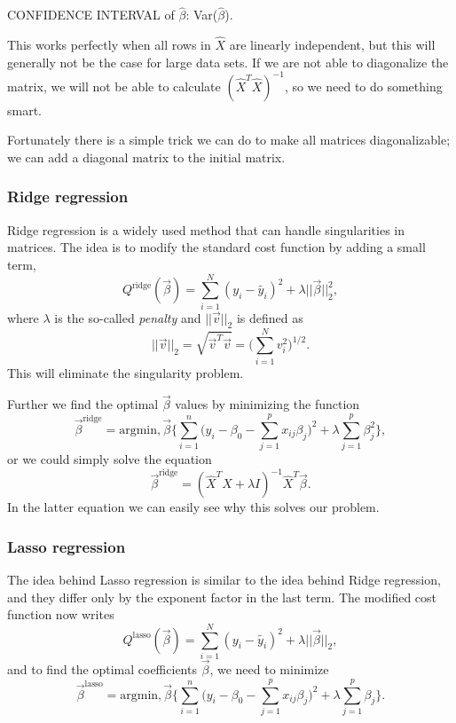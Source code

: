 CONFIDENCE INTERVAL of $\hat{\beta}$: Var($\hat{\beta}$).

This works perfectly when all rows in $\hat{X}$ are linearly independent, but this will generally not be the case for large data sets. If we are not able to diagonalize the matrix, we will not be able to calculate $(\hat{X}^T\hat{X})^{-1}$, so we need to do something smart. 

Fortunately there is a simple trick we can do to make all matrices diagonalizable; we can add a diagonal matrix to the initial matrix. 


\subsubsection{Ridge regression} \label{sec:ridge}
Ridge regression is a widely used method that can handle singularities in matrices. The idea is to modify the standard cost function by adding a small term,
\begin{equation}
Q^{\text{ridge}}(\vec{\beta})=\sum_{i=1}^N(y_i-\tilde{y_i})^2+\lambda||\vec{\beta}||_2^2,
\end{equation}
where $\lambda$ is the so-called \textit{penalty} and $||\vec{v}||_2$ is defined as
\begin{equation}
||\vec{v}||_2=\sqrt{\vec{v}^T\vec{v}}=\Big(\sum_{i=1}^Nv_i^2\Big)^{1/2}.
\end{equation}
This will eliminate the singularity problem.

Further we find the optimal $\vec{\beta}$ values by minimizing the function 
\begin{equation}
\vec{\beta}^{\text{ridge}}=\text{argmin},\vec{\beta}\bigg\{\sum_{i=1}^{n}\Big(y_i-\beta_0-\sum_{j=1}^px_{ij}\beta_j\Big)^2+\lambda\sum_{j=1}^p\beta_j^2\bigg\}, 
\end{equation}
or we could simply solve the equation
\begin{equation}
\vec{\beta}^{\text{ridge}}=(\hat{X}^T\hat{X}+\lambda I)^{-1}\hat{X}^T\vec{\beta}.
\end{equation}
In the latter equation we can easily see why this solves our problem.

\subsubsection{Lasso regression} \label{sec:lasso}
The idea behind Lasso regression is similar to the idea behind Ridge regression, and they differ only by the exponent factor in the last term. The modified cost function now writes
\begin{equation}
Q^{\text{lasso}}(\vec{\beta})=\sum_{i=1}^N(y_i-\tilde{y_i})^2+\lambda||\vec{\beta}||_2,
\end{equation}
and to find the optimal coefficients $\vec{\beta}$, we need to minimize
\begin{equation}
\vec{\beta}^{\text{lasso}}=\text{argmin},\vec{\beta}\bigg\{\sum_{i=1}^{n}\Big(y_i-\beta_0-\sum_{j=1}^px_{ij}\beta_j\Big)^2+\lambda\sum_{j=1}^p\beta_j\bigg\}.
\end{equation}


